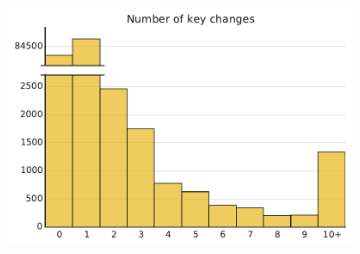 \documentclass{article}
\begin{document}
\begin{figure}
\begin{subfigure}{.23\textwidth}
    \end{subfigure}
    \begin{subfigure}{.23\textwidth}
        \includegraphics[width=\textwidth]{n_keys.pdf}
    \end{subfigure}


\end{figure}
\end{document}
